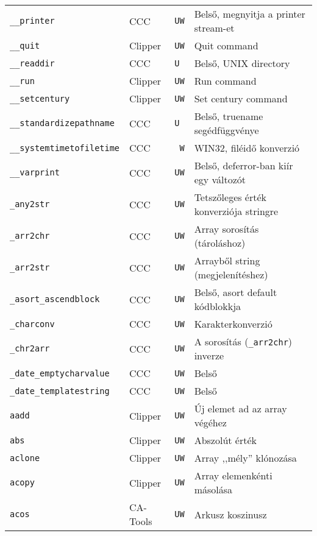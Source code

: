 \begin{tabular}{|l|l|l|l|}
\verb!__printer!                   & CCC      &  {\tt UW} & Belső, megnyitja a printer stream-et\\ 
\verb!__quit!                      & Clipper  &  {\tt UW} & Quit command\\ 
\verb!__readdir!                   & CCC      &  {\tt U~} & Belső, UNIX directory\\ 
\verb!__run!                       & Clipper  &  {\tt UW} & Run command\\
\verb!__setcentury!                & Clipper  &  {\tt UW} & Set century command\\
\verb!__standardizepathname!       & CCC      &  {\tt U~} & Belső, truename segédfüggvénye\\
\verb!__systemtimetofiletime!      & CCC      &  {\tt ~W} & WIN32, filéidő konverzió\\
\verb!__varprint!                  & CCC      &  {\tt UW} & Belső, deferror-ban kiír egy változót\\
\verb!_any2str!                    & CCC      &  {\tt UW} & Tetszőleges érték konverziója stringre\\
\verb!_arr2chr!                    & CCC      &  {\tt UW} & Array sorosítás (tároláshoz)\\
\verb!_arr2str!                    & CCC      &  {\tt UW} & Arrayből string (megjelenítéshez)\\
\verb!_asort_ascendblock!          & CCC      &  {\tt UW} & Belső, asort default kódblokkja\\
\verb!_charconv!                   & CCC      &  {\tt UW} & Karakterkonverzió\\
\verb!_chr2arr!                    & CCC      &  {\tt UW} & A sorosítás (\verb!_arr2chr!) inverze\\
\verb!_date_emptycharvalue!        & CCC      &  {\tt UW} & Belső\\
\verb!_date_templatestring!        & CCC      &  {\tt UW} & Belső\\
\verb!aadd!                        & Clipper  &  {\tt UW} & Új elemet ad az array végéhez\\
\verb!abs!                         & Clipper  &  {\tt UW} & Abszolút érték\\
\verb!aclone!                      & Clipper  &  {\tt UW} & Array ,,mély'' klónozása\\
\verb!acopy!                       & Clipper  &  {\tt UW} & Array elemenkénti másolása\\
\verb!acos!                        & CA-Tools &  {\tt UW} & Arkusz koszinusz\\

\end{tabular}
